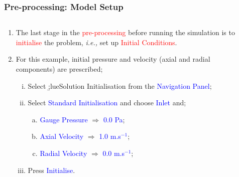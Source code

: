 \documentclass[10pt,compress, unknownkeysallowed]{beamer}
\newcommand{\red}{\textcolor{red}}
\newcommand{\blue}{\textcolor{blue}}
\newcommand{\ie}{{\it i.e., }}
\begin{document}
\begin{frame}
  \frametitle{Pre-processing: Model Setup}
    \begin{columns}
        \begin{column}[l]{0.5\linewidth}
           \begin{enumerate}\scriptsize\setcounter{enumi}{23}
                \item<1-> The last stage in the \red{pre-processing} before running the simulation is to \red{initialise} the problem, \ie set up \red{Initial Conditions}.
                \item<1-> For this example, initial pressure and velocity (axial and radial components) are prescribed;
                    \begin{enumerate}[i)]\scriptsize
                       \item<2-> Select \b;lue{Solution Initialisation} from the \blue{Navigation Panel};
                       \item<2-> Select \blue{Standard Initialisation} and choose \blue{Inlet} and;
                       \begin{enumerate}[(a)]\scriptsize
                          \item<2-> \blue{Gauge Pressure} $\Rightarrow$ \blue{0.0 Pa}; 
                          \item<2-> \blue{Axial Velocity} $\Rightarrow$ \blue{1.0 m.s$^{-1}$}; 
                          \item<2-> \blue{Radial Velocity} $\Rightarrow$ \blue{0.0 m.s$^{-1}$}; 
                       \end{enumerate}
                       \item<2-> Press \blue{Initialise}.
                    \end{enumerate}                    
           \end{enumerate}
        \end{column}
           \begin{column}[l]{0.5\linewidth}
\end{column}
\end{columns}
\end{frame}
\end{document}

